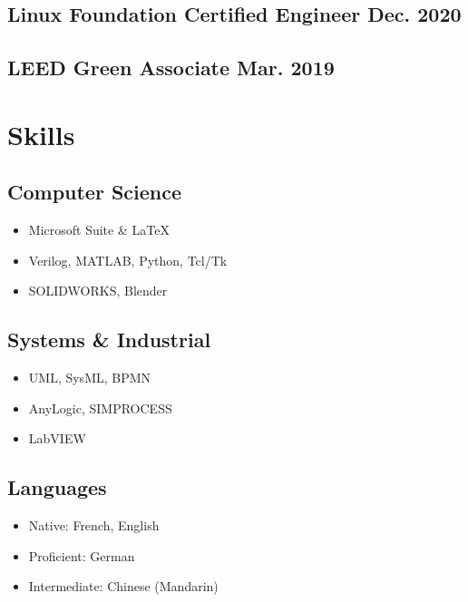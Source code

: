 \documentclass[10pt]{article}
\begin{document}
\subsection*{Linux Foundation Certified Engineer \hfill Dec. 2020}
\label{sec:orge756ade}

\subsection*{LEED Green Associate \hfill Mar. 2019}
\label{sec:orgbc57800}

\section*{Skills}
\label{sec:orga6ea95e}

\subsection*{Computer Science}
\label{sec:org5af75ec}

\begin{itemize}
\item Microsoft Suite \& \LaTeX
\item Verilog, MATLAB, Python, Tcl/Tk
\item SOLIDWORKS, Blender
\end{itemize}

\subsection*{Systems \& Industrial}
\label{sec:org217dfb0}

\begin{itemize}
\item UML, SysML, BPMN
\item AnyLogic, SIMPROCESS
\item LabVIEW
\end{itemize}

\subsection*{Languages}
\label{sec:orga9ee723}

\begin{itemize}
\item Native: French, English
\item Proficient: German
\item Intermediate: Chinese (Mandarin)
\end{itemize}
\end{document}
